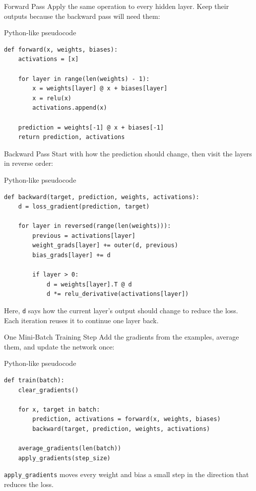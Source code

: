 \documentclass[aspectratio=169]{beamer}
\begin{document}
\begin{frame}[fragile]{Forward Pass}
  \small
  Apply the same operation to every hidden layer. Keep their outputs because
  the backward pass will need them:

  \begin{block}{Python-like pseudocode}
\begin{verbatim}
def forward(x, weights, biases):
    activations = [x]

    for layer in range(len(weights) - 1):
        x = weights[layer] @ x + biases[layer]
        x = relu(x)
        activations.append(x)

    prediction = weights[-1] @ x + biases[-1]
    return prediction, activations
\end{verbatim}
  \end{block}
\end{frame}

\begin{frame}[fragile]{Backward Pass}
  \footnotesize
  Start with how the prediction should change, then visit the layers in
  reverse order:

  \begin{block}{Python-like pseudocode}
\begin{verbatim}
def backward(target, prediction, weights, activations):
    d = loss_gradient(prediction, target)

    for layer in reversed(range(len(weights))):
        previous = activations[layer]
        weight_grads[layer] += outer(d, previous)
        bias_grads[layer] += d

        if layer > 0:
            d = weights[layer].T @ d
            d *= relu_derivative(activations[layer])
\end{verbatim}
  \end{block}

  {\scriptsize
    Here, \texttt{d} says how the current layer's output should change to
    reduce the loss. Each iteration reuses it to continue one layer back.
  }
\end{frame}

\begin{frame}[fragile]{One Mini-Batch Training Step}
  \small
  Add the gradients from the examples, average them, and update the network
  once:

  \begin{block}{Python-like pseudocode}
\begin{verbatim}
def train(batch):
    clear_gradients()

    for x, target in batch:
        prediction, activations = forward(x, weights, biases)
        backward(target, prediction, weights, activations)

    average_gradients(len(batch))
    apply_gradients(step_size)
\end{verbatim}
  \end{block}

  \texttt{apply\_gradients} moves every weight and bias a small step in the
  direction that reduces the loss.
\end{frame}
\end{document}
